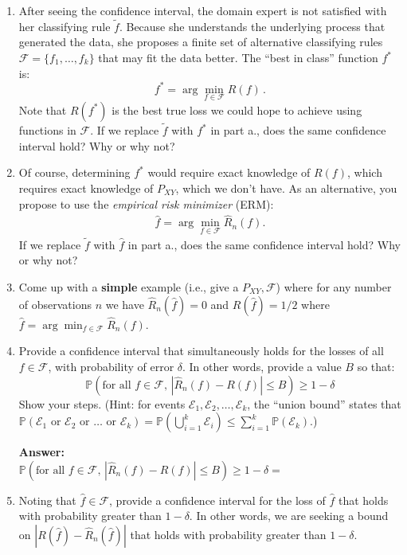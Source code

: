 \documentclass{article}
\newcommand{\1}{\mathbf{1}}
\renewcommand{\P}{\mathbb{P}} %
\begin{document}
\begin{enumerate}
  \item After seeing the confidence interval, the domain expert is not satisfied with her classifying rule $\widetilde{f}$. Because she understands the underlying process that generated the data, she proposes a finite set of alternative classifying rules $\mathcal{F} = \{ f_1,\dots,f_k \}$ that may fit the data better.
  The ``best in class'' function $f^*$ is:
  \[
  f^* = \arg\min_{f \in \mathcal{F}} R(f) \, . 
  \]
  Note that $R(f^*)$ is the best true loss we could hope to achieve using functions in $\mathcal{F}$.
  If we replace $\widetilde{f}$ with $f^*$ in part a., does the same confidence interval hold? Why or why not?
  \item Of course, determining $f^*$ would require exact knowledge of $R(f)$, which requires exact knowledge of $P_{XY}$, which we don't have. 
  As an alternative, you propose to use the \emph{empirical risk minimizer} (ERM):
  \begin{align*}
  \widehat f = \arg\min_{f\in\mathcal{F}} \widehat R_n(f).
  \end{align*}
  If we replace $\widetilde{f}$ with $\widehat{f}$ in part a., does the same confidence interval hold? Why or why not? 
  \item Come up with a \textbf{simple} example (i.e., give a $P_{XY},\mathcal{F}$) where for any number of observations $n$ we have $\widehat{R}_n(\widehat{f})=0$ and $R(\widehat{f})=1/2$ where $\widehat{f} = \arg\min_{f \in \mathcal{F}} \widehat{R}_n(f)$.  
  \item  Provide a confidence interval that simultaneously holds for the losses of all $f \in \mathcal{F}$, with probability of error $\delta$. In other words, provide a value $B$ so that:
\[
\P( \textrm{for all } f\in\mathcal{F}, \, |\widehat R_n(f) -  R(f)|
\leq B ) \geq 1- \delta
\]
Show your steps. (Hint: for events $\mathcal{E}_1, \mathcal{E}_2, \ldots, \mathcal{E}_k$, the ``union bound'' states that  $\P(\mathcal{E}_1 \textrm{ or } \mathcal{E}_2 \textrm{ or } \dots \text{ or } \mathcal{E}_k) = \P(\bigcup_{i=1}^k \mathcal{E}_i ) \leq \sum_{i=1}^k \P(\mathcal{E}_k)$.)

\textbf{Answer:}\\
$\P( \textrm{for all } f\in\mathcal{F}, \, |\widehat R_n(f) -  R(f)| \leq B ) \geq 1- \delta = $\\

\item Noting that $\widehat{f} \in \mathcal{F}$, provide a confidence interval for the loss of $\widehat f$ that holds with
  probability greater than $1-\delta$. In other words, we are seeking
  a bound on $|R(\widehat f)-\widehat R_n(\widehat f)|$ that holds with probability greater than $1-\delta$.


\end{enumerate}
\end{document}
